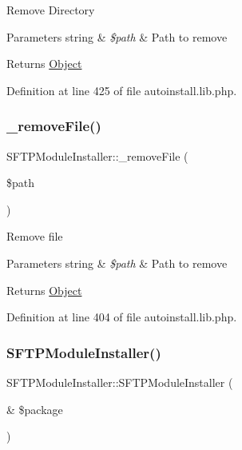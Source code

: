 Remove Directory


\begin{DoxyParams}[1]{Parameters}
string & {\em \$path} & Path to remove \\
\hline
\end{DoxyParams}
\begin{DoxyReturn}{Returns}
\hyperlink{classObject}{Object} 
\end{DoxyReturn}


Definition at line 425 of file autoinstall.\+lib.\+php.

\mbox{\label{classSFTPModuleInstaller_abd1dd628941e99ee3ab526cf19cc7d54}} 
\subsubsection{\texorpdfstring{\+\_\+remove\+File()}{\_removeFile()}}
{\footnotesize\ttfamily S\+F\+T\+P\+Module\+Installer\+::\+\_\+remove\+File (\begin{DoxyParamCaption}\item[{}]{\$path }\end{DoxyParamCaption})}

Remove file


\begin{DoxyParams}[1]{Parameters}
string & {\em \$path} & Path to remove \\
\hline
\end{DoxyParams}
\begin{DoxyReturn}{Returns}
\hyperlink{classObject}{Object} 
\end{DoxyReturn}


Definition at line 404 of file autoinstall.\+lib.\+php.

\mbox{\label{classSFTPModuleInstaller_ae2ab80c52793052af4aeb66bc1b8910b}} 
\subsubsection{\texorpdfstring{S\+F\+T\+P\+Module\+Installer()}{SFTPModuleInstaller()}}
{\footnotesize\ttfamily S\+F\+T\+P\+Module\+Installer\+::\+S\+F\+T\+P\+Module\+Installer (\begin{DoxyParamCaption}\item[{\&}]{\$package }\end{DoxyParamCaption})}

